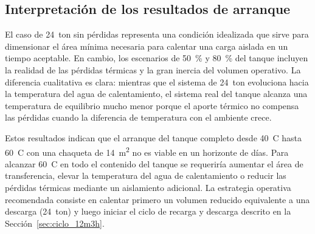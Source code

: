 \subsection{Interpretación de los resultados de arranque}

El caso de 24~ton sin pérdidas representa una condición idealizada que sirve para dimensionar el área mínima necesaria para calentar una carga aislada en un tiempo aceptable. En cambio, los escenarios de 50~\% y 80~\% del tanque incluyen la realidad de las pérdidas térmicas y la gran inercia del volumen operativo. La diferencia cualitativa es clara: mientras que el sistema de 24~ton evoluciona hacia la temperatura del agua de calentamiento, el sistema real del tanque alcanza una temperatura de equilibrio mucho menor porque el aporte térmico no compensa las pérdidas cuando la diferencia de temperatura con el ambiente crece.

Estos resultados indican que el arranque del tanque completo desde 40~\textdegree C hasta 60~\textdegree C con una chaqueta de 14~m\textsuperscript{2} no es viable en un horizonte de días. Para alcanzar 60~\textdegree C en todo el contenido del tanque se requeriría aumentar el área de transferencia, elevar la temperatura del agua de calentamiento o reducir las pérdidas térmicas mediante un aislamiento adicional. La estrategia operativa recomendada consiste en calentar primero un volumen reducido equivalente a una descarga (24~ton) y luego iniciar el ciclo de recarga y descarga descrito en la Sección~\ref{sec:ciclo_12m3h}.
